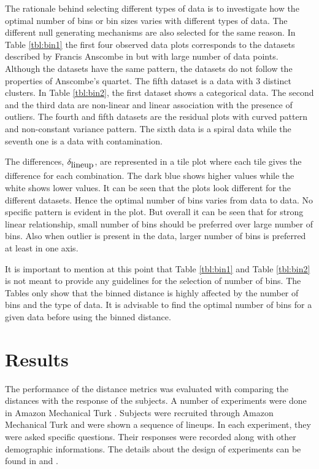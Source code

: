 \documentclass[12]{article}
\begin{document}
The rationale behind selecting different types of data is to investigate how the optimal number of bins or bin sizes varies with different types of data. The different null generating mechanisms are also selected for the same reason. In Table \ref{tbl:bin1} the first four observed data plots corresponds to the datasets described by Francis Anscombe in \citep{anscombe:1972} but with large number of data points. Although the datasets have the same pattern, the datasets do not follow the properties of Anscombe's quartet. The fifth dataset is a data with 3 distinct clusters. In Table \ref{tbl:bin2}, the first dataset shows a categorical data. The second and the third data are non-linear and linear association with the presence of outliers. The fourth and fifth datasets are the residual plots with curved pattern and non-constant variance pattern. The sixth data is a spiral data while the seventh one is a data with contamination. 

The differences, $\delta_{\hbox{lineup}}$, are represented in a tile plot where each tile gives the difference for each combination. The dark blue shows higher values while the white shows lower values. It can be seen that the plots look different for the different datasets. Hence the optimal number of bins varies from data to data. No specific pattern is evident in the plot. But overall it can be seen that for strong linear relationship, small number of bins should be preferred over large number of bins. Also when outlier is present in the data, larger number of bins is preferred at least in one axis.

It is important to mention at this point that Table \ref{tbl:bin1} and Table \ref{tbl:bin2} is not meant to provide any guidelines for the selection of number of bins. The Tables only show that the binned distance is highly affected by the number of bins and the type of data. It is advisable to find the optimal number of bins for a given data before using the binned distance.


\section{Results} \label{sec:results}


The performance of the distance metrics was evaluated with comparing the distances with the response of the subjects. A number of experiments were done in Amazon Mechanical Turk \citep{turk}. Subjects were recruited through Amazon Mechanical Turk \citep{turk} and were shown a sequence of lineups. In each experiment, they were asked specific questions. Their responses were recorded along with other demographic informations. The details about the design of experiments can be found in \cite{majumder:2011} and \cite{roychowdhury:2013}. 
\end{document}
